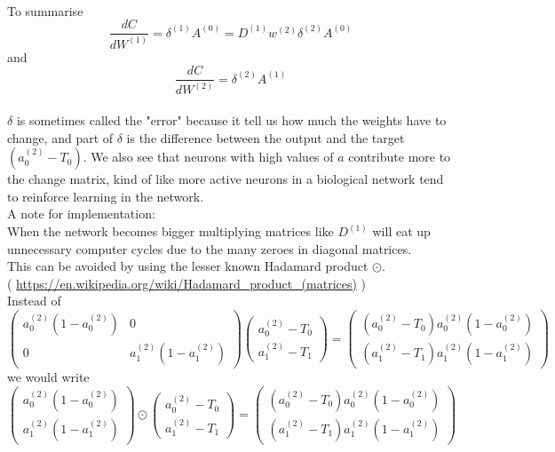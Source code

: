 \documentclass{article}
\begin{document}
\\
To summarise
\[
\frac{dC}{dW^{(1)}} = \delta^{(1)} A^{(0)} = D^{(1)} w^{(2)} \delta^{(2)}  A^{(0)}
\]
and
\[
\frac{dC}{dW^{(2)}} = \delta^{(2)} A^{(1)}
\]
\\
$\delta$ is sometimes called the "error" because it tell us how much the weights have to change, and part of $\delta$ is the difference between the output and the target $(a_{0}^{(2)}-T_0)$. We also see that neurons with high values of $a$ contribute more to the change matrix, kind of like more active neurons in a biological network tend to reinforce learning in the network.
\\
A note for implementation:
\\
When the network becomes bigger multiplying matrices like $D^{(1)}$ will eat up unnecessary computer cycles due to the many zeroes in diagonal matrices.
\\
This can be avoided by using the lesser known Hadamard product $\odot$.
\\
( \url{https://en.wikipedia.org/wiki/Hadamard_product_(matrices)} )
\\
Instead of
\[
\begin{pmatrix}
a_{0}^{(2)}(1-a_{0}^{(2)}) & 0 \\
0 & a_{1}^{(2)}(1-a_{1}^{(2)})
\end{pmatrix}
\begin{pmatrix}
a_{0}^{(2)}-T_0 \\ a_{1}^{(2)}-T_1
\end{pmatrix} =
\begin{pmatrix}
(a_0^{(2)}-T_0)a_0^{(2)}(1-a_0^{(2)}) \\ (a_1^{(2)}-T_1)a_1^{(2)}(1-a_1^{(2)})
\end{pmatrix}
\]
we would write
\\
\[
\begin{pmatrix}
a_{0}^{(2)}(1-a_{0}^{(2)}) \\
a_{1}^{(2)}(1-a_{1}^{(2)})
\end{pmatrix}
\odot
\begin{pmatrix}
a_{0}^{(2)}-T_0 \\ a_{1}^{(2)}-T_1
\end{pmatrix} =
\begin{pmatrix}
(a_0^{(2)}-T_0)a_0^{(2)}(1-a_0^{(2)}) \\ (a_1^{(2)}-T_1)a_1^{(2)}(1-a_1^{(2)})
\end{pmatrix}
\]
\\
\\
\\
\end{document}
